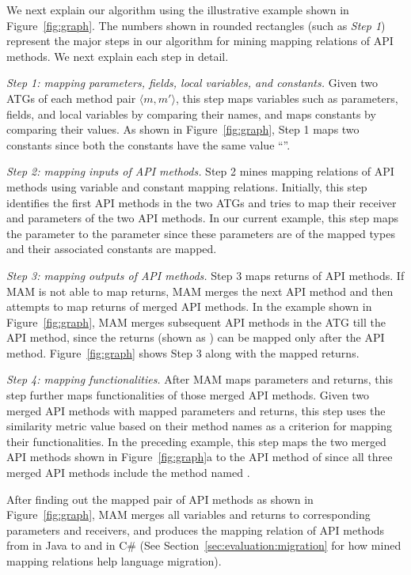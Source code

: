 We next explain our algorithm using the illustrative example shown
in Figure~\ref{fig:graph}. The numbers shown in rounded rectangles (such as \emph{Step 1})
represent the major steps in our algorithm for mining mapping
relations of API methods. We next explain each step in detail.

\emph{Step 1: mapping parameters, fields, local variables, and constants.}
Given two ATGs of each method pair $\langle m, m' \rangle$, this step maps
variables such as parameters, fields, and local variables by comparing their names,
and maps constants by comparing their values. As shown in
Figure~\ref{fig:graph}, Step 1 maps two constants since both the constants
have the same value ``''.

\emph{Step 2: mapping inputs of API methods.} Step 2 mines mapping
relations of API methods using variable and constant mapping relations.
Initially, this step identifies the first API methods in the two ATGs and tries to
map their receiver and parameters of the two API methods.
In our current example, this step maps the parameter 
to the parameter  since these parameters
are of the mapped types and their associated constants are mapped.

\emph{Step 3: mapping outputs of API methods.} Step 3 maps returns of API methods. If MAM is not able to map returns, MAM merges the next API method and
then attempts to map returns of merged API methods. In the example shown in
Figure~\ref{fig:graph}, MAM merges subsequent API methods in the ATG till the 
API method, since the returns (shown as ) can be mapped
only after the  API method. Figure~\ref{fig:graph}
shows Step 3 along with the mapped returns.

\emph{Step 4: mapping functionalities.} After MAM maps
parameters and returns, this step further maps functionalities
of those merged API methods. Given two merged API methods with
mapped parameters and returns, this step uses the similarity
metric value based on their method names as a criterion for mapping
their functionalities. In the preceding example, this step maps the
two merged API methods shown in Figure~\ref{fig:graph}a to the
API method of  since all
three merged API methods include the method named .

After finding out
the mapped pair of API methods as shown in Figure~\ref{fig:graph},
MAM merges all variables and returns to corresponding
parameters and receivers, and produces the mapping relation of API
methods from  in Java to  and  in C\# (See Section~\ref{sec:evaluation:migration} for how mined mapping relations help language migration).

